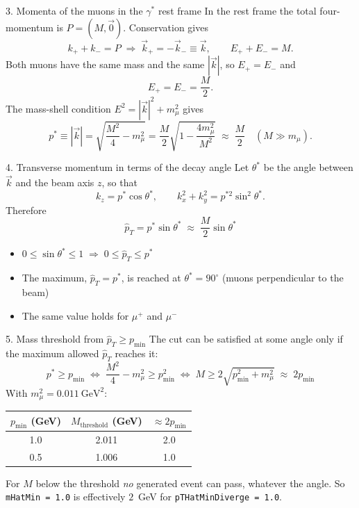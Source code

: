 \documentclass[aspectratio=169]{beamer}
\begin{document}
\begin{frame}{3. Momenta of the muons in the $\gamma^*$ rest frame}
  In the rest frame the total four-momentum is $P=(M,\vec 0)$. Conservation gives
  \[
    k_+ + k_- = P \;\Rightarrow\; \vec k_+ = -\vec k_- \equiv \vec k,\qquad E_++E_- = M .
  \]
  Both muons have the same mass and the same $|\vec k|$, so $E_+ = E_-$ and
  \[
    E_+ = E_- = \frac{M}{2}.
  \]
  The mass-shell condition $E^2 = |\vec k|^2 + m_\mu^2$ gives
  \[
    p^* \equiv |\vec k| = \sqrt{\frac{M^2}{4} - m_\mu^2}
      = \frac{M}{2}\sqrt{1 - \frac{4m_\mu^2}{M^2}} \;\approx\; \frac{M}{2}
    \quad (M \gg m_\mu).
  \]
\end{frame}

\begin{frame}{4. Transverse momentum in terms of the decay angle}
  Let $\theta^*$ be the angle between $\vec k$ and the beam axis $z$, so that
  \[
    k_z = p^*\cos\theta^*,\qquad
    k_x^2 + k_y^2 = p^{*2}\sin^2\theta^* .
  \]
  Therefore
  \[
    \boxed{\hat p_T = p^*\sin\theta^* \;\approx\; \frac{M}{2}\sin\theta^*}
  \]
  \begin{itemize}
    \item $0 \le \sin\theta^* \le 1 \;\Rightarrow\; 0 \le \hat p_T \le p^*$
    \item The maximum, $\hat p_T = p^*$, is reached at $\theta^*=90^\circ$
          (muons perpendicular to the beam)
    \item The same value holds for $\mu^+$ and $\mu^-$
  \end{itemize}
\end{frame}

\begin{frame}{5. Mass threshold from $\hat p_T \ge p_{\min}$}
  The cut can be satisfied at some angle only if the maximum allowed $\hat p_T$ reaches it:
  \[
    p^* \ge p_{\min}
    \;\Longleftrightarrow\;
    \frac{M^2}{4} - m_\mu^2 \ge p_{\min}^2
    \;\Longleftrightarrow\;
    \boxed{M \ge 2\sqrt{p_{\min}^2 + m_\mu^2}\;\approx\; 2p_{\min}}
  \]
  With $m_\mu^2 = 0.011~\text{GeV}^2$:
  \begin{center}
  \begin{tabular}{ccc}
    $p_{\min}$ (GeV) & $M_{\text{threshold}}$ (GeV) & $\approx 2p_{\min}$\\ \hline
    1.0 & 2.011 & 2.0\\
    0.5 & 1.006 & 1.0
  \end{tabular}
  \end{center}
  For $M$ below the threshold \emph{no} generated event can pass, whatever the angle.
  So \texttt{mHatMin = 1.0} is effectively $2$~GeV for \texttt{pTHatMinDiverge = 1.0}.
\end{frame}
\end{document}
